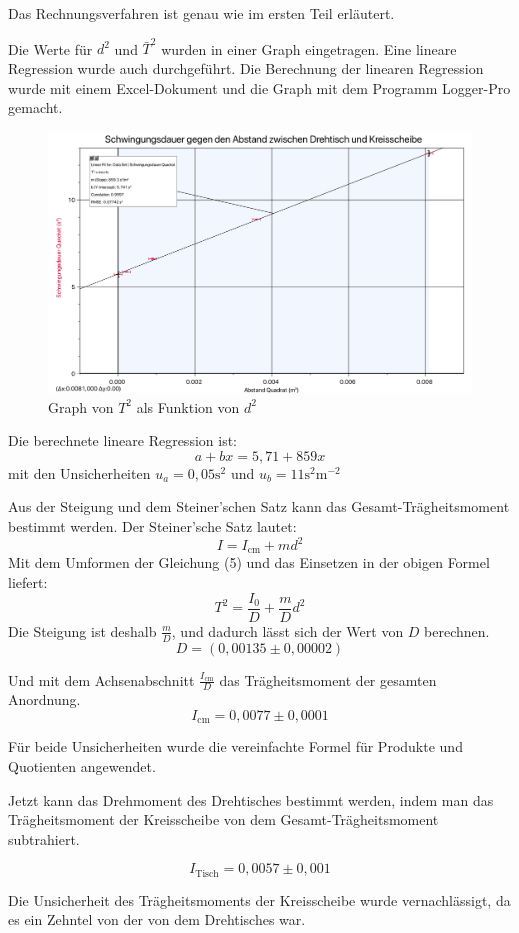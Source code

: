 \documentclass[11pt,a4paper]{article} %
\begin{document}
Das Rechnungsverfahren ist genau wie im ersten Teil erläutert. 

Die Werte für $d^2$ und $\bar{T}^2$ wurden in einer Graph eingetragen. Eine lineare Regression wurde auch durchgeführt. Die Berechnung der linearen Regression wurde mit einem Excel-Dokument und die Graph mit dem Programm Logger-Pro gemacht. 
\begin{figure}[h]
	\centering
	\includegraphics[width=\linewidth]{Graph1}
	\caption{Graph von $T^2$ als Funktion von $d^2$}
\end{figure}
Die berechnete lineare Regression ist:
$$a+bx = 5,71 + 859x$$
mit den Unsicherheiten $u_a = 0,05 \textrm{s}^2$ und $u_b = 11 \textrm{s}^2 \textrm{m}^{-2}$

Aus der Steigung und dem Steiner'schen Satz kann das Gesamt-Trägheitsmoment bestimmt werden. Der Steiner'sche Satz lautet:
$$ I = I_\textrm{cm} + md^2 $$
Mit dem Umformen der Gleichung (5) und das Einsetzen in der obigen Formel liefert:
$$T^2 = \frac{I_0}{D} + \frac{m}{D}d^2$$
Die Steigung ist deshalb $\frac{m}{D}$, und dadurch lässt sich der Wert von $D$ berechnen. 
$$D = (0,00135 \pm 0,00002)$$

Und mit dem Achsenabschnitt $\frac{I_\textrm{cm}}{D}$ das Trägheitsmoment der gesamten Anordnung. 
$$ I_\textrm{cm} = 0,0077 \pm 0,0001 $$

Für beide Unsicherheiten wurde die vereinfachte Formel für Produkte und Quotienten angewendet.

Jetzt kann das Drehmoment des Drehtisches bestimmt werden, indem man das Trägheitsmoment der Kreisscheibe von dem Gesamt-Trägheitsmoment subtrahiert. 

$$I_\textrm{Tisch} = 0,0057 \pm 0,001 $$

Die Unsicherheit des Trägheitsmoments der Kreisscheibe wurde vernachlässigt, da es ein Zehntel von der von dem Drehtisches war. 
\end{document}
